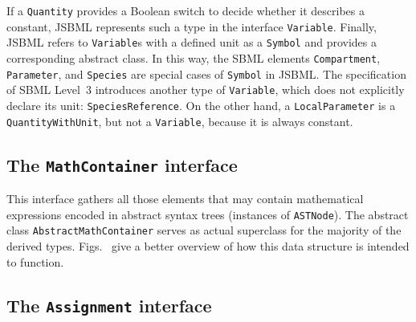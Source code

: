 If a \texttt{Quantity} provides a Boolean
%
switch to decide whether it describes a constant,
%
JSBML represents such a type in the interface \texttt{Variable}.
%
Finally, JSBML refers to \texttt{Variable}s with a defined unit as a
\texttt{Symbol}
%
and provides a corresponding abstract class. In this way, the
SBML elements \texttt{Compartment}, \texttt{Parameter}, and \texttt{Species}
%
%
%
are special cases of \texttt{Symbol} in JSBML. The specification of SBML Level~3
%
introduces another type of \texttt{Variable}, which does not explicitly declare
its unit: \texttt{SpeciesReference}. On the other hand, a
\texttt{LocalParameter}
%
is a \texttt{QuantityWithUnit},
%
but not a \texttt{Variable}, because it is always constant.
%


\subsection{The \texttt{MathContainer} interface}

This interface gathers all those elements that may contain mathematical
expressions encoded in abstract syntax trees (instances of
\texttt{ASTNode}).
The abstract class \texttt{AbstractMathContainer}
%
serves as actual superclass
for the majority of the derived types.
Figs.~ give a better
overview of how this data structure is intended to function.


\subsection{The \texttt{Assignment} interface}

